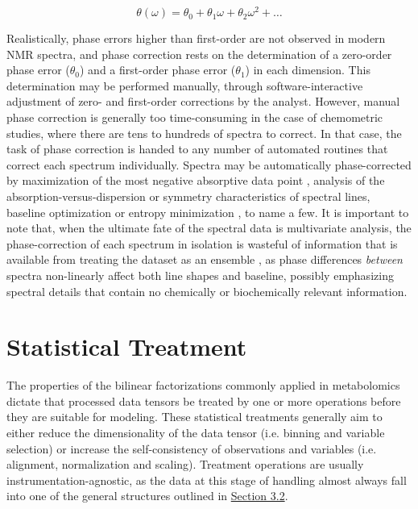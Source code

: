 \begin{doublespace}
\begin{equation}
\theta(\omega) = \theta_0 + \theta_1 \omega + \theta_2 \omega^2 + \dots
\end{equation}

Realistically, phase errors higher than first-order are not observed in modern
NMR spectra, and phase correction rests on the determination of a zero-order
phase error ($\theta_0$) and a first-order phase error ($\theta_1$) in each
dimension. This determination may be performed manually, through
software-interactive adjustment of zero- and first-order corrections by the
analyst. However, manual phase correction is generally too time-consuming in
the case of chemometric studies, where there are tens to hundreds of spectra
to correct. In that case, the task of phase correction is handed to any number
of automated routines that correct each spectrum individually. Spectra may be
automatically phase-corrected by maximization of the most negative absorptive
data point \cite{siegel:aca1981}, analysis of the absorption-versus-dispersion
\cite{craig:jmr1988} or symmetry \cite{heuer:jmr1991} characteristics of
spectral lines, baseline optimization \cite{brown:jmr1989} or entropy
minimization \cite{chen:jmr2002}, to name a few. It is important to note that,
when the ultimate fate of the spectral data is multivariate analysis, the
phase-correction of each spectrum in isolation is wasteful of information that
is available from treating the dataset as an ensemble \cite{worley:cils2014},
as phase differences {\it between} spectra non-linearly affect both line shapes
and baseline, possibly emphasizing spectral details that contain no
chemically or biochemically relevant information.
\end{doublespace}

\section{Statistical Treatment}

\begin{doublespace}
The properties of the bilinear factorizations commonly applied in metabolomics
dictate that processed data tensors be treated by one or more operations before
they are suitable for modeling. These statistical treatments generally aim to
either reduce the dimensionality of the data tensor (i.e. binning and variable
selection) or increase the self-consistency of observations and variables
(i.e. alignment, normalization and scaling). Treatment operations are usually
instrumentation-agnostic, as the data at this stage of handling almost always
fall into one of the general structures outlined in
\hyperlink{section.3.2}{Section 3.2}.
\end{doublespace}

